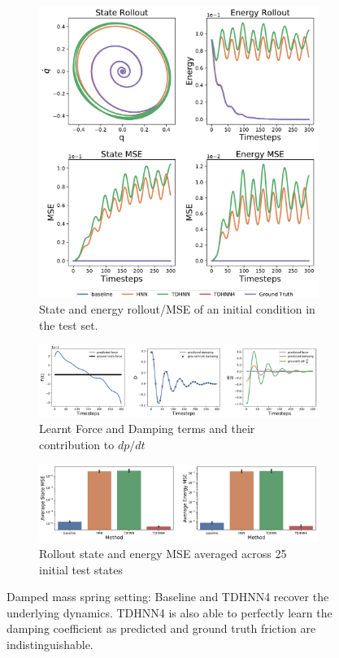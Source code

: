 \documentclass[twoside]{article}
\begin{document}
\begin{figure}[h!]
\centering
\captionsetup{justification=centering}
	\begin{subfigure}[b]{0.4\textwidth}
		\centering
		\includegraphics[width=\textwidth]{figures/damped_1_pred.pdf}
		\caption{State and energy rollout/MSE of an initial condition in the test set.}
	\end{subfigure}
	\begin{subfigure}[b]{0.48\textwidth}
		\centering
		\includegraphics[width=\textwidth]{figures/dpdt_damped.pdf}
		\caption{Learnt Force and Damping terms and their contribution to $dp/dt$}
	\end{subfigure}
	\begin{subfigure}[b]{0.48\textwidth}
	    \centering
		\includegraphics[width=\textwidth]{figures/damped_1_errors.pdf}
		\caption{Rollout state and energy MSE averaged across 25 initial test states}
	\end{subfigure}
\caption{Damped mass spring setting: Baseline and TDHNN4 recover the underlying dynamics. TDHNN4 is also able to perfectly learn the damping coefficient as predicted and ground truth friction are indistinguishable.}
\label{damped}
\end{figure}
\end{document}
